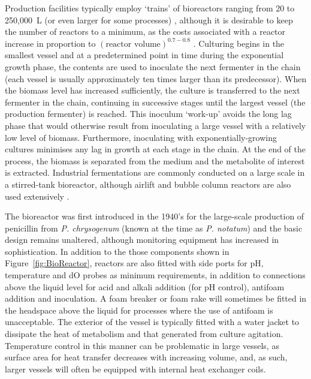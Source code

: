 Production facilities typically employ \lq trains' of bioreactors ranging from 20 to 250,000~L (or even larger for some processes) \cite{chisti2001}, although it is desirable to keep the number of reactors to a minimum, as the costs associated with a reactor increase in proportion to $(\mbox{reactor volume})^{0.7-0.8}$ \cite{kristiansen2001}. Culturing begins in the smallest vessel and at a predetermined point in time during the exponential growth phase, the contents are used to inoculate the next fermenter in the chain (each vessel is usually approximately ten times larger than its predecessor). When the biomass level has increased sufficiently, the culture is transferred to the next fermenter in the chain, continuing in successive stages until the largest vessel (the production fermenter) is reached. This inoculum \lq work-up' avoids the long lag phase that would otherwise result from inoculating a large vessel with a relatively low level of biomass. Furthermore, inoculating with exponentially-growing cultures minimises any lag in growth at each stage in the chain. At the end of the process, the biomass is separated from the medium and the metabolite of interest is extracted. Industrial fermentations are commonly conducted on a large scale in a stirred-tank bioreactor, although airlift and bubble column reactors are also used extensively \cite{chisti2001}.

The bioreactor was first introduced in the 1940's for the large-scale production of penicillin from \emph{P. chrysogenum} (known at the time as \emph{P. notatum}) \cite{carlile2001} and the basic design remains unaltered, although monitoring equipment has increased in sophistication. In addition to the those components shown in Figure~\ref{fig:BioReactor}, reactors are also fitted with side ports for pH, temperature and dO probes as minimum requirements, in addition to connections above the liquid level for acid and alkali addition (for pH control), antifoam addition and inoculation. A foam breaker or foam rake will sometimes be fitted in the headspace above the liquid for processes where the use of antifoam is unacceptable. The exterior of the vessel is typically fitted with a water jacket to dissipate the heat of metabolism and that generated from culture agitation. Temperature control in this manner can be problematic in large vessels, as surface area for heat transfer decreases with increasing volume, and, as such, larger vessels will often be equipped with internal heat exchanger coils.


